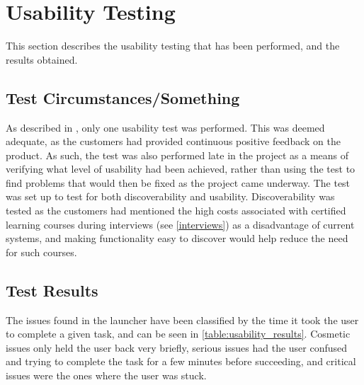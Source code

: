 \section{Usability Testing}
\label{sec:usability_test}
This section describes the usability testing that has been performed, and the results obtained. 

\subsection{Test Circumstances/Something}
As described in , only one usability test was performed. 
This was deemed adequate, as the customers had provided continuous positive feedback on the product. 
As such, the test was also performed late in the project as a means of verifying what level of usability had been achieved, rather than using the test to find problems that would then be fixed as the project came underway. \newline
The test was set up to test for both discoverability and usability. 
Discoverability was tested as the customers had mentioned the high costs associated with certified learning courses during interviews (see \autoref{interviews}) as a disadvantage of current systems, and making functionality easy to discover would help reduce the need for such courses.

\subsection{Test Results}
The issues found in the launcher have been classified by the time it took the user to complete a given task, and can be seen in \autoref{table:usability_results}. 
Cosmetic issues only held the user back very briefly, serious issues had the user confused and trying to complete the task for a few minutes before succeeding, and critical issues were the ones where the user was stuck. 

